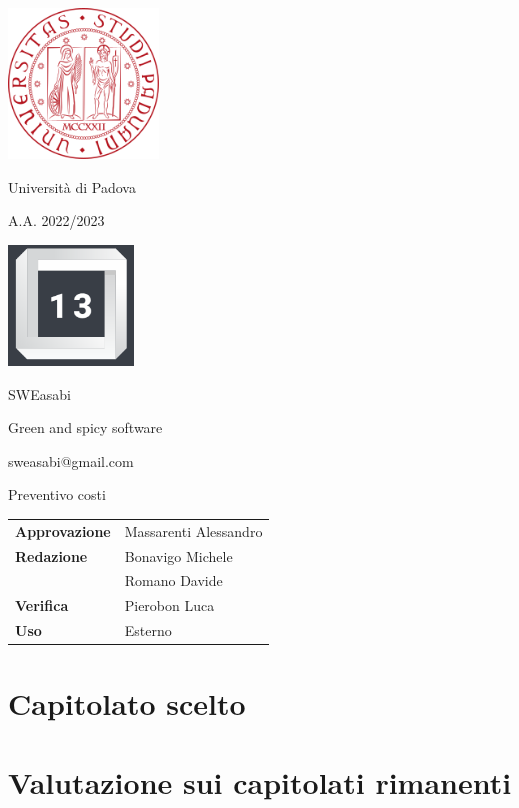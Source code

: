 \documentclass{article}
\begin{document}
\begin{center}
    
    \includegraphics[width=0.3\textwidth]{immagini/logo_unipd.png}

    Università di Padova
    
    A.A. 2022/2023
    
    \vspace{4cm}

    \includegraphics[width=0.25\textwidth]{immagini/logo_13.png}
    
    \Large SWEasabi

    \tiny Green and spicy software

    \small sweasabi@gmail.com
        
    \vspace{2cm}

    \Huge Preventivo costi
        
    \vspace{2cm}
    
    \normalsize
    \begin{center}
        \begin{tabularx}{7cm}{l | X}            
            \textbf{Approvazione} & Massarenti Alessandro\\
            \textbf{Redazione} & Bonavigo Michele \\
            & Romano Davide\\
            \textbf{Verifica} & Pierobon Luca\\
            \hline
            \textbf{Uso} & Esterno\\
        \end{tabularx}
    \end{center}
        
\end{center}

\newpage

\tableofcontents

\newpage

\section{Capitolato scelto}
%

\section{Valutazione sui capitolati rimanenti}

\end{document}
